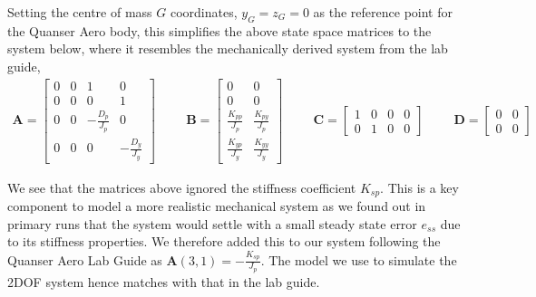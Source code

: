 \documentclass[11pt]{article}
\begin{document}
Setting the centre of mass $G$ coordinates, $y_G = z_G = 0$ as the reference point for the Quanser Aero body, this simplifies the above state space matrices to the system below, where it resembles the mechanically derived system from the lab guide,
\begin{align*}
\mathbf{A} = \begin{bmatrix}
    0 & 0 & 1 & 0\\
    0 & 0 & 0 & 1\\
    0 & 0 & -\frac{D_p}{J_p} & 0\\
    0 & 0 & 0 & -\frac{D_y}{J_y}
    \end{bmatrix} \hspace{1cm}
\mathbf{B} = \begin{bmatrix}
    0 & 0\\
    0 & 0\\
    \frac{K_{pp}}{J_p} & \frac{K_{py}}{J_p}\\
    \frac{K_{yp}}{J_y} & \frac{K_{yy}}{J_y}
    \end{bmatrix} \hspace{1cm}
\mathbf{C} = \begin{bmatrix}
    1 & 0 & 0 & 0\\
    0 & 1 & 0 & 0
    \end{bmatrix} \hspace{1cm}
\mathbf{D} = \begin{bmatrix}
    0 & 0\\
    0 & 0
\end{bmatrix}
\end{align*}

We see that the matrices above ignored the stiffness coefficient $K_{sp}$. This is a key component to model a more realistic mechanical system as we found out in primary runs that the system would settle with a small steady state error $e_{ss}$ due to its stiffness properties. We therefore added this to our system following the Quanser Aero Lab Guide as $\mathbf{A}(3,1) = -\frac{K_{sp}}{J_p}$. The model we use to simulate the 2DOF system hence matches with that in the lab guide.\\
\end{document}
